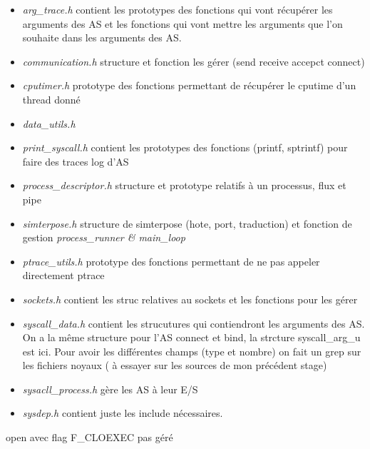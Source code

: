 \documentclass{article}
\begin{document}
\begin{itemize}
\item \textit{{\color{yellow}arg\_trace.h}} contient les prototypes des fonctions  qui vont récupérer les arguments des AS et les fonctions qui vont mettre les arguments que l'on souhaite dans les arguments des AS.
\item \textit{communication.h} structure et fonction les gérer (send receive accepct connect)
\item \textit{cputimer.h} prototype des fonctions permettant de récupérer le cputime d'un thread donné
\item \textit{{\color{red} data\_utils.h}}
\item \textit{print\_syscall.h} contient les prototypes des fonctions (printf, sptrintf)  pour faire des traces log d'AS
\item \textit{{\color{yellow}process\_descriptor.h}} structure et prototype relatifs à un processus, flux et pipe
\item \textit{simterpose.h} structure de simterpose (hote, port, traduction) et fonction de gestion \textit{process\_runner \& main\_loop}
\item \textit{ptrace\_utils.h} prototype des fonctions permettant de ne pas appeler directement ptrace
\item \textit{sockets.h} contient les struc relatives au sockets et les fonctions pour les gérer
\item \textit{{\color{yellow}syscall\_data.h}} contient les strucutures qui contiendront les arguments des AS. On a la même structure pour l'AS connect et bind, la strcture {\color{red} syscall\_arg\_u} est ici. Pour avoir les différentes champs (type et nombre) on fait un grep sur les fichiers noyaux ( {\color{red} à essayer sur les sources de mon précédent stage})
\item \textit{{\color{yellow} sysacll\_process.h }} gère les AS à leur E/S
\item \textit{sysdep.h} contient juste les include nécessaires.
\end{itemize}

open avec flag F\_CLOEXEC pas géré
\end{document}
